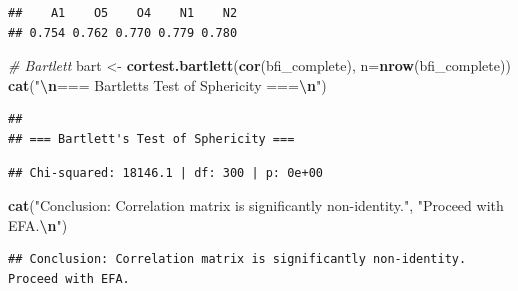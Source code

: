 \documentclass[
]{article}
\newenvironment{Shaded}{\begin{snugshade}}{\end{snugshade}}
\newcommand{\AttributeTok}[1]{\textcolor[rgb]{0.13,0.29,0.53}{#1}}
\newcommand{\CommentTok}[1]{\textcolor[rgb]{0.56,0.35,0.01}{\textit{#1}}}
\newcommand{\ConstantTok}[1]{\textcolor[rgb]{0.56,0.35,0.01}{#1}}
\newcommand{\DecValTok}[1]{\textcolor[rgb]{0.00,0.00,0.81}{#1}}
\newcommand{\FunctionTok}[1]{\textcolor[rgb]{0.13,0.29,0.53}{\textbf{#1}}}
\newcommand{\NormalTok}[1]{#1}
\newcommand{\OtherTok}[1]{\textcolor[rgb]{0.56,0.35,0.01}{#1}}
\newcommand{\SpecialCharTok}[1]{\textcolor[rgb]{0.81,0.36,0.00}{\textbf{#1}}}
\newcommand{\StringTok}[1]{\textcolor[rgb]{0.31,0.60,0.02}{#1}}
\begin{document}
\begin{verbatim}
##    A1    O5    O4    N1    N2 
## 0.754 0.762 0.770 0.779 0.780
\end{verbatim}

\begin{Shaded}
\begin{Highlighting}[]
\CommentTok{\# Bartlett}
\NormalTok{bart }\OtherTok{\textless{}{-}} \FunctionTok{cortest.bartlett}\NormalTok{(}\FunctionTok{cor}\NormalTok{(bfi\_complete), }\AttributeTok{n=}\FunctionTok{nrow}\NormalTok{(bfi\_complete))}
\FunctionTok{cat}\NormalTok{(}\StringTok{"}\SpecialCharTok{\textbackslash{}n}\StringTok{=== Bartlett\textquotesingle{}s Test of Sphericity ===}\SpecialCharTok{\textbackslash{}n}\StringTok{"}\NormalTok{)}
\end{Highlighting}
\end{Shaded}

\begin{verbatim}
## 
## === Bartlett's Test of Sphericity ===
\end{verbatim}

\begin{Shaded}
\end{Shaded}

\begin{verbatim}
## Chi-squared: 18146.1 | df: 300 | p: 0e+00
\end{verbatim}

\begin{Shaded}
\begin{Highlighting}[]
\FunctionTok{cat}\NormalTok{(}\StringTok{"Conclusion: Correlation matrix is significantly non{-}identity."}\NormalTok{,}
    \StringTok{"Proceed with EFA.}\SpecialCharTok{\textbackslash{}n}\StringTok{"}\NormalTok{)}
\end{Highlighting}
\end{Shaded}

\begin{verbatim}
## Conclusion: Correlation matrix is significantly non-identity. Proceed with EFA.
\end{verbatim}
\end{document}
